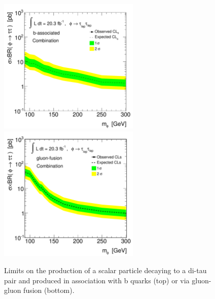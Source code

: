 \begin{figure}[tp]
  \centering
 \includegraphics[width=0.6\textwidth]{figure/limits/bbA_combined_thesi.pdf}
 \includegraphics[width=0.6\textwidth]{figure/limits/ggA_comb_thesi.pdf}
  \caption{ Limits on the production of a scalar particle decaying to a di-tau pair
    and produced     in association with b quarks (top) or   via gluon-gluon fusion (bottom).}
\label{fig:limit_xs}
\end{figure}

